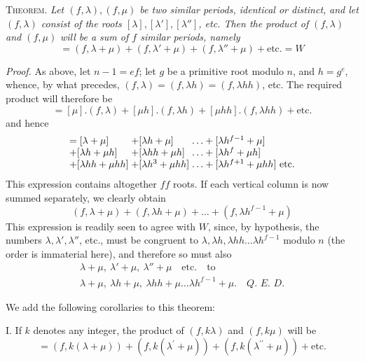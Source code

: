 \textsc{Theorem.} \textit{Let \((f,\allowbreak \lambda),\allowbreak (f,\allowbreak \mu)\) be two similar periods, identical or distinct,} \textit{and let \((f,\allowbreak \lambda)\) consist of the roots \([\lambda],\allowbreak [\lambda'],\allowbreak [\lambda'']\), etc. Then the product of \((f,\allowbreak \lambda)\) and \((f,\allowbreak \mu)\)} \textit{will be a sum of \(f\) similar periods, namely} \[=(f,\lambda+\mu)+(f,\lambda'+\mu)+(f,\lambda''+\mu)+\mathrm{etc.}=W\]

\textit{Proof.} As above, let \(n-1=ef\); let \(g\) be a primitive root modulo \(n\), and \(h=g^e\), whence, by what precedes, \((f,\allowbreak \lambda)=(f,\allowbreak \lambda h)=(f,\allowbreak \lambda hh)\), etc. The required product will therefore be \[=[\mu].(f,\lambda)+[\mu h].(f,\lambda h)+[\mu hh].(f,\lambda hh)+\mathrm{etc.}\] and hence \[\begin{array}{@{}l@{\;}l@{\;}l@{}}
=[\lambda+\mu]&+[\lambda h+\mu]&\ldots+[\lambda h^{f-1}+\mu]\\
+[\lambda h+\mu h]&+[\lambda hh+\mu h]&\ldots+[\lambda h^f+\mu h]\\
+[\lambda hh+\mu hh]&+[\lambda h^3+\mu hh]&\ldots+[\lambda h^{f+1}+\mu hh]\ \mathrm{etc.}
\end{array}\] This expression contains altogether \(ff\) roots. If each vertical column is now summed separately, we clearly obtain \[(f,\lambda+\mu)+(f,\lambda h+\mu)+\ldots+(f,\lambda h^{f-1}+\mu)\] This expression is readily seen to agree with \(W\), since, by hypothesis, the numbers \(\lambda,\allowbreak \lambda',\allowbreak \lambda''\), etc., must be congruent to \(\lambda,\allowbreak \lambda h,\allowbreak \lambda hh\ldots\lambda h^{f-1}\) modulo \(n\) (the order is immaterial here), and therefore so must also \[\begin{gathered}
\lambda+\mu,\ \lambda'+\mu,\ \lambda''+\mu\quad\mathrm{etc.}\quad\text{to}\\
\lambda+\mu,\ \lambda h+\mu,\ \lambda hh+\mu\ldots\lambda h^{f-1}+\mu.\quad\textit{Q. E. D.}
\end{gathered}\]

We add the following corollaries to this theorem:

I. If \(k\) denotes any integer, the product of \((f,\allowbreak k\lambda)\) and \((f,\allowbreak k\mu)\) will be \[=(f,k(\lambda+\mu))+(f,k(\lambda^{\prime}+\mu))+(f,k(\lambda^{\prime\prime}+\mu))+\text{etc.}\]

